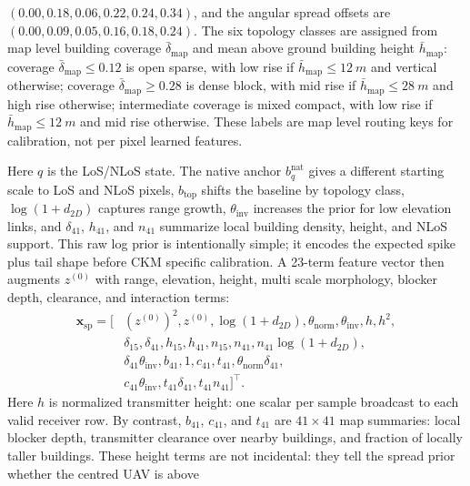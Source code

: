\documentclass[journal]{IEEEtran}
\begin{document}
\((0.00,0.18,0.06,0.22,0.24,0.34)\), and the angular spread offsets are
\((0.00,0.09,0.05,0.16,0.18,0.24)\). The six topology classes are assigned
from map level building coverage \(\bar\delta_{\mathrm{map}}\) and mean
above ground building height \(\bar h_{\mathrm{map}}\): coverage
\(\bar\delta_{\mathrm{map}}\le 0.12\) is open sparse, with low rise if
\(\bar h_{\mathrm{map}}\le\SI{12}{m}\) and vertical otherwise; coverage
\(\bar\delta_{\mathrm{map}}\ge 0.28\) is dense block, with mid rise if
\(\bar h_{\mathrm{map}}\le\SI{28}{m}\) and high rise otherwise; intermediate
coverage is mixed compact, with low rise if
\(\bar h_{\mathrm{map}}\le\SI{12}{m}\) and mid rise otherwise. These labels are
map level routing keys for calibration, not per pixel learned features.

Here \(q\) is the LoS/NLoS state. The native anchor
\(b^{\mathrm{nat}}_q\) gives a different starting scale to LoS and NLoS
pixels, \(b_{\mathrm{top}}\) shifts the baseline by topology class,
\(\log(1+d_{2D})\) captures range growth, \(\theta_{\mathrm{inv}}\) increases
the prior for low elevation links, and \(\delta_{41}\), \(h_{41}\), and
\(n_{41}\) summarize local building density, height, and NLoS support. This
raw log prior is intentionally simple; it encodes the expected spike plus tail
shape before CKM specific calibration. A 23-term feature vector then augments
\(z^{(0)}\) with range, elevation, height, multi scale morphology,
blocker depth, clearance, and interaction terms:
\begin{equation}
\begin{aligned}
\mathbf{x}_{\mathrm{sp}}=[&
(z^{(0)})^2,z^{(0)},\log(1+d_{2D}),\theta_{\mathrm{norm}},
\theta_{\mathrm{inv}},h,h^2,\\
&\delta_{15},\delta_{41},h_{15},h_{41},n_{15},n_{41},
n_{41}\log(1+d_{2D}),\\
&\delta_{41}\theta_{\mathrm{inv}},b_{41},1,c_{41},t_{41},
\theta_{\mathrm{norm}}\delta_{41},\\
&c_{41}\theta_{\mathrm{inv}},t_{41}\delta_{41},t_{41}n_{41}]^{\top}.
\end{aligned}
\label{eq:spread-feature-vector-paper}
\end{equation}
Here \(h\) is normalized transmitter height: one scalar per sample broadcast to
each valid receiver row. By contrast, \(b_{41}\), \(c_{41}\), and \(t_{41}\) are
\(41\times41\) map summaries: local blocker depth, transmitter clearance over
nearby buildings, and fraction of locally taller buildings. These height terms
are not incidental: they tell the spread prior whether the centred UAV is above
\end{document}
